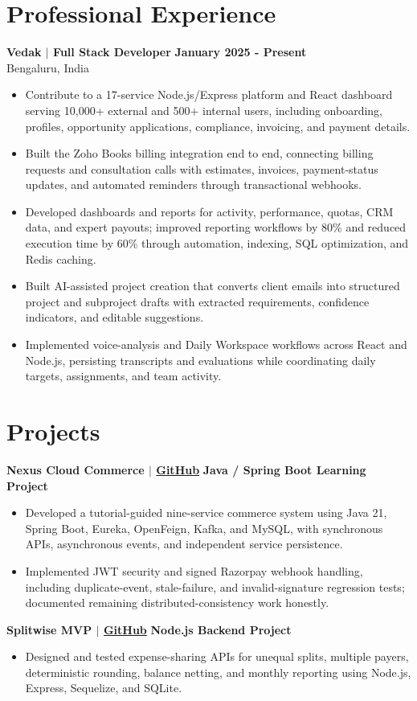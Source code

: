 \documentclass[a4paper,11pt]{article}
\begin{document}
\section{Professional Experience}
\textbf{Vedak $|$ Full Stack Developer} \hfill \textbf{January 2025 - Present}\\
Bengaluru, India
\begin{itemize}
  \item Contribute to a 17-service Node.js/Express platform and React dashboard serving 10,000+ external and 500+ internal users, including onboarding, profiles, opportunity applications, compliance, invoicing, and payment details.
  \item Built the Zoho Books billing integration end to end, connecting billing requests and consultation calls with estimates, invoices, payment-status updates, and automated reminders through transactional webhooks.
  \item Developed dashboards and reports for activity, performance, quotas, CRM data, and expert payouts; improved reporting workflows by 80\% and reduced execution time by 60\% through automation, indexing, SQL optimization, and Redis caching.
  \item Built AI-assisted project creation that converts client emails into structured project and subproject drafts with extracted requirements, confidence indicators, and editable suggestions.
  \item Implemented voice-analysis and Daily Workspace workflows across React and Node.js, persisting transcripts and evaluations while coordinating daily targets, assignments, and team activity.
\end{itemize}

\section{Projects}
\textbf{Nexus Cloud Commerce $|$ \href{https://github.com/kumarbanty143/nexus-cloud-commerce}{GitHub}} \hfill \textbf{Java / Spring Boot Learning Project}
\begin{itemize}
  \item Developed a tutorial-guided nine-service commerce system using Java 21, Spring Boot, Eureka, OpenFeign, Kafka, and MySQL, with synchronous APIs, asynchronous events, and independent service persistence.
  \item Implemented JWT security and signed Razorpay webhook handling, including duplicate-event, stale-failure, and invalid-signature regression tests; documented remaining distributed-consistency work honestly.
\end{itemize}
\textbf{Splitwise MVP $|$ \href{https://github.com/kumarbanty143/splitwise-mvp}{GitHub}} \hfill \textbf{Node.js Backend Project}
\begin{itemize}
  \item Designed and tested expense-sharing APIs for unequal splits, multiple payers, deterministic rounding, balance netting, and monthly reporting using Node.js, Express, Sequelize, and SQLite.
\end{itemize}
\end{document}
